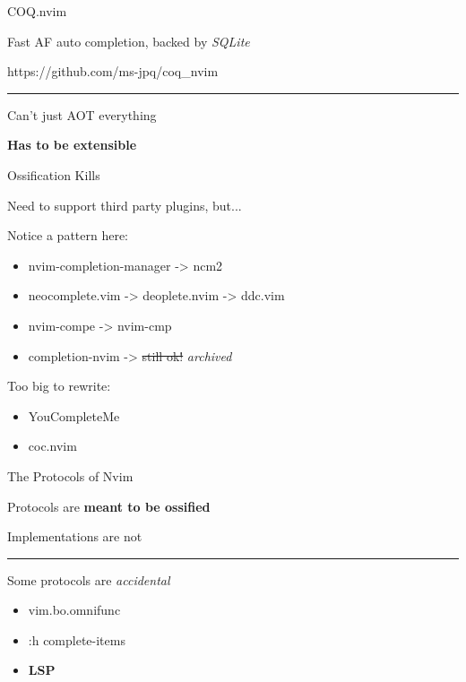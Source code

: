 \documentclass{beamer}
\begin{document}
\begin{frame}{COQ.nvim}

	Fast AF auto completion, backed by \textit{SQLite}

	https://github.com/ms-jpq/coq\_nvim

	\rule{\textwidth}{0.1em}

	Can't just AOT everything

	\textbf{Has to be extensible}

\end{frame}


\begin{frame}{Ossification Kills}

	Need to support third party plugins, but...

	Notice a pattern here:

	\begin{itemize}

		\item nvim-completion-manager -> ncm2

		\item neocomplete.vim -> deoplete.nvim -> ddc.vim

		\item nvim-compe -> nvim-cmp

		\item completion-nvim -> \st{still ok!} \textit{archived}

	\end{itemize}

	Too big to rewrite:

	\begin{itemize}

		\item YouCompleteMe

		\item coc.nvim

	\end{itemize}

\end{frame}


\begin{frame}{The Protocols of Nvim}

	Protocols are \textbf{meant to be ossified}

	Implementations are not

	\rule{\textwidth}{0.1em}

	Some protocols are \textit{accidental}

	\begin{itemize}

		\item vim.bo.omnifunc

		\item :h complete-items

		\item \textbf{LSP}

	\end{itemize}

\end{frame}
\end{document}
